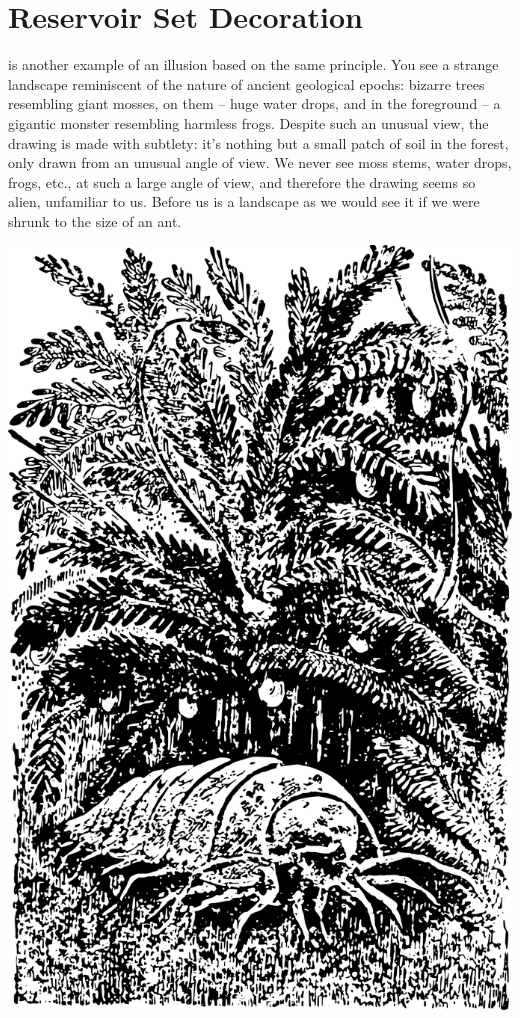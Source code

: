 \section{Reservoir Set Decoration}
\label{sec-3.6}

 is another example of an illusion based on the same principle. You see a strange landscape reminiscent of the nature of ancient geological epochs: bizarre trees resembling giant mosses, on them -- huge water drops, and in the foreground -- a gigantic monster resembling harmless frogs. Despite such an unusual view, the drawing is made with subtlety: it's nothing but a small patch of soil in the forest, only drawn from an unusual angle of view. We never see moss stems, water drops, frogs, etc., at such a large angle of view, and therefore the drawing seems so alien, unfamiliar to us. Before us is a landscape as we would see it if we were shrunk to the size of an ant. 

\begin{marginfigure}[-1cm]%
\centering
\includegraphics[width=\textwidth]{figures/ch-03/fig-066.pdf}
\end{marginfigure}

